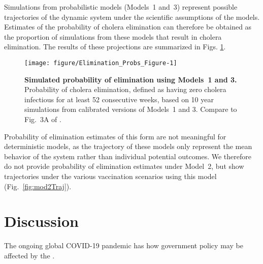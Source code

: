 \documentclass[10pt,letterpaper]{article}\usepackage[]{graphicx}\usepackage[table]{xcolor}
\makeatletter
\def\maxwidth{ %
  \ifdim\Gin@nat@width>\linewidth
    \linewidth
  \else
    \Gin@nat@width
  \fi
}
\newenvironment{knitrout}{}{} %
\newcommand\figTitle{\bf}
\makeatother
\begin{document}
Simulations from probabilistic models (Models~1 and~3) represent possible trajectories of the dynamic system under the scientific assumptions of the models.
\new{\editModVacc}
Estimates of the probability of cholera elimination can therefore be obtained as the proportion of simulations from these models that result in cholera elimination.
The results of these projections are summarized in Figs. \ref{fig:elimProbs}.



\begin{figure}[!h]
\begin{knitrout}
\color{fgcolor}
\texttt{[image: figure/Elimination\_Probs\_Figure-1]} 
\end{knitrout}
\caption{\label{fig:elimProbs}
{\figTitle Simulated probability of elimination using Models~1 and 3.}
Probability of cholera elimination, defined as having zero cholera infectious for at least 52 consecutive weeks, based on 10 year simulations from calibrated versions of Models~1 and 3.
Compare to Fig.~3A of \cite{lee20}.}
\end{figure}

Probability of elimination estimates of this form are not meaningful for deterministic models, as the trajectory of these models only represent the mean behavior of the system rather than individual potential outcomes.
We therefore do not provide probability of elimination estimates under Model~2, but show trajectories under the various vaccination scenarios using this model (Fig.~\ref{fig:mod2Traj}).

\section*{Discussion}\label{sec:discussion}

The ongoing global COVID-19 pandemic has   how government policy may be affected by the   \cite{saltelli20}.
\end{document}

